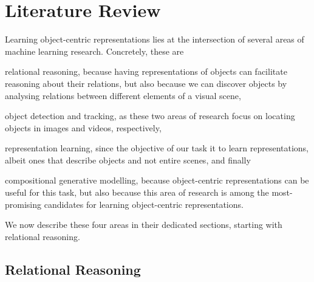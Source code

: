 \chapter{Literature Review}
\label{ch:lit_review}

	Learning object-centric representations lies at the intersection of several areas of machine learning research. 
	Concretely, these are \begin{inparaenum}[(1)\!]
	\item relational reasoning, because having representations of objects can facilitate reasoning about their relations, but also because we can discover objects by analysing relations between different elements of a visual scene,
	\item object detection and tracking, as these two areas of research focus on locating objects in images and videos, respectively,
	\item representation learning, since the objective of our task it to learn representations, albeit ones that describe objects and not entire scenes, and finally
	\item compositional generative modelling, because object-centric representations can be useful for this task, but also because this area of research is among the most-promising candidates for learning object-centric representations.
	\end{inparaenum}
	We now describe these four areas in their dedicated sections, starting with relational reasoning.


\section{Relational Reasoning}
\label{sec:relational_reasoning}

